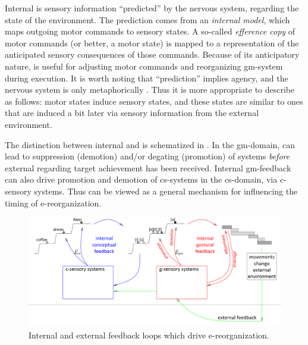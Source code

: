   Internal  is sensory information “predicted” by the nervous system, regarding the state of the environment. The prediction comes from an \textit{internal model}, which maps outgoing motor commands to sensory states. A so-called \textit{efference copy} of motor commands (or better, a motor state) is mapped to a representation of the anticipated sensory consequences of those commands. Because of its anticipatory nature,  is useful for adjusting motor commands and reorganizing gm-sys\-tem during execution. It is worth noting that “prediction” implies agency, and the nervous system is only metaphorically . Thus it is more appropriate to describe  as follows: motor states induce sensory states, and these states are similar to ones that are induced a bit later via sensory information from the external environment.

The distinction between internal and  is schematized in {}. In the gm-domain,  can lead to suppression (demotion) and/or degating (promotion) of systems \textit{before} external  regarding target achievement has been received. Internal gm-feedback can also drive promotion and demotion of cs-systems in the cs-domain, via c-sensory systems. Thus  can be viewed as a general mechanism for influencing the timing of e-reorganization.

  
\begin{figure}
\includegraphics[width=\textwidth]{figures/Tilsen-img57.png}
\caption{Internal and external feedback loops which drive e-reorganization.}
\label{fig:4:7}
\end{figure}
       

